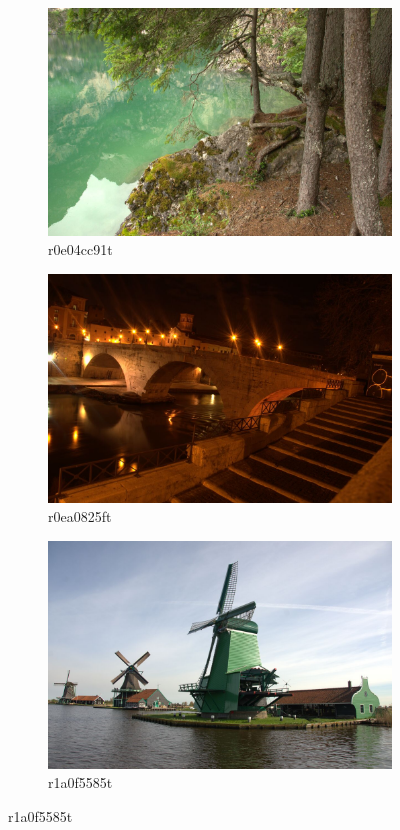 \documentclass{ipol}
\begin{document}
\begin{figure}[ht]
    \begin{subfigure}[c]{.31\linewidth}\centering
    \includegraphics[width=\linewidth]{images/original/r0e04cc91t.jpeg}
    \caption{r0e04cc91t}
    \end{subfigure}\hfill%
    \begin{subfigure}[c]{.31\linewidth}\centering
    \includegraphics[width=\linewidth]{images/original/r0ea0825ft.jpeg}
    \caption{r0ea0825ft}
    \end{subfigure}\hfill%
    \begin{subfigure}[c]{.31\linewidth}\centering
    \includegraphics[width=\linewidth]{images/original/r1a0f5585t.jpeg}
    \caption{r1a0f5585t}
    \end{subfigure}
    

\end{figure}
\end{document}

